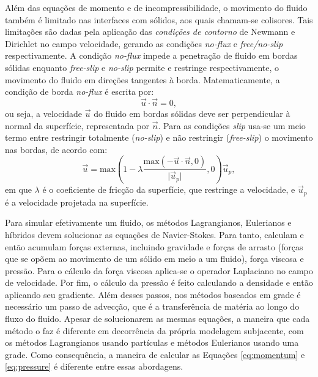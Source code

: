 \documentclass[12pt,a4paper,dvipsnames]{article}
\begin{document}
Além das equações de momento e de incompressibilidade, o movimento do fluido também é limitado nas interfaces com sólidos, aos quais chamam-se colisores. Tais limitações são dadas pela aplicação das \textit{condições de contorno} de Newmann e Dirichlet no campo velocidade, gerando as condições \textit{no-flux} e \textit{free/no-slip} respectivamente. A condição \textit{no-flux} impede a penetração de fluido em bordas sólidas enquanto \textit{free-slip} e \textit{no-slip} permite e restringe respectivamente, o movimento do fluido em direções tangentes à borda. Matematicamente, a condição de borda \textit{no-flux} é escrita por:
%
\begin{equation}
    \Vec{u} \cdot \Vec{n} = 0,
    \label{eq:noflux}
\end{equation}
ou seja, a velocidade $\Vec{u}$ do fluido em bordas sólidas deve ser perpendicular à normal da superfície, representada por $\Vec{n}$. Para as condições \textit{slip} usa-se um meio termo entre restringir totalmente (\textit{no-slip}) e não restringir (\textit{free-slip}) o movimento nas bordas, de acordo com:
%
\begin{equation}
    \label{eq:slipcond}
    \Vec{u} = \text{max}\left( 1 - \lambda \frac{\text{max}\left(-\Vec{u} \cdot \Vec{n},0\right)}{\lvert \Vec{u}_{p}\rvert}, 0\right) \Vec{u}_{p},
\end{equation}
em que $\lambda$ é o coeficiente de fricção da superfície, que restringe a velocidade, e $\Vec{u}_p$ é a velocidade projetada na superfície.

Para simular efetivamente um fluido, os métodos Lagrangianos, Eulerianos e híbridos devem solucionar as equações de Navier-Stokes. Para tanto, calculam e então acumulam forças externas, incluindo gravidade e forças de arrasto (forças que se opõem ao movimento de um sólido em meio a um fluido), força viscosa e pressão. Para o cálculo da força viscosa aplica-se o operador Laplaciano no campo de velocidade. Por fim, o cálculo da pressão é feito calculando a densidade e então aplicando seu gradiente. Além desses passos, nos métodos baseados em grade é necessário um passo de advecção, que é a transferência de matéria ao longo do fluxo do fluido. Apesar de solucionarem as mesmas equações, a maneira que cada método o faz é diferente em decorrência da própria modelagem subjacente, com os métodos Lagrangianos usando partículas e métodos Eulerianos usando uma grade. Como consequência, a maneira de calcular as Equações \eqref{eq:momentum} e \eqref{eq:pressure} é diferente entre essas abordagens.
\end{document}
